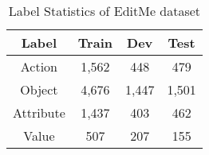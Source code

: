 \documentclass[11pt,a4paper]{article}
\begin{document}
\begin{table}[h]
  \centering
\begin{tabular}{c|c|c|c}
    \textbf{Label} & \textbf{Train} & \textbf{Dev} & \textbf{Test}  \\
    \hline
    Action & 1,562 & 448 & 479  \\
    Object & 4,676 & 1,447 & 1,501 \\
    Attribute & 1,437 & 403 & 462 \\
    Value & 507 & 207 & 155 \\
\end{tabular}
    \caption{Label Statistics of EditMe dataset}
    \label{tab:label-statistics}
\end{table}
\end{document}
